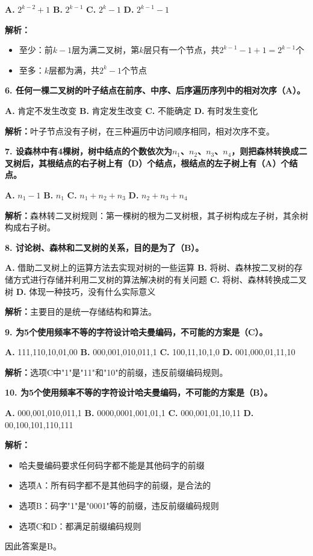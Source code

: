 \documentclass[12pt,a4paper]{amsart}
\begin{document}
\textbf{A.} $2^{k-2}+1$
\textbf{B.} $2^{k-1}$
\textbf{C.} $2^k-1$
\textbf{D.} $2^{k-1}-1$

\textbf{解析：}
\begin{itemize}
\item 至少：前$k-1$层为满二叉树，第$k$层只有一个节点，共$2^{k-1}-1+1=2^{k-1}$个
\item 至多：$k$层都为满，共$2^k-1$个节点
\end{itemize}

\textbf{6. 任何一棵二叉树的叶子结点在前序、中序、后序遍历序列中的相对次序（A）。}

\textbf{A.} 肯定不发生改变
\textbf{B.} 肯定发生改变
\textbf{C.} 不能确定
\textbf{D.} 有时发生变化

\textbf{解析：}叶子节点没有子树，在三种遍历中访问顺序相同，相对次序不变。

\textbf{7. 设森林中有4棵树，树中结点的个数依次为$n_1$、$n_2$、$n_3$、$n_4$，则把森林转换成二叉树后，其根结点的右子树上有（D）个结点，根结点的左子树上有（A）个结点。}

\textbf{A.} $n_1-1$
\textbf{B.} $n_1$
\textbf{C.} $n_1+n_2+n_3$
\textbf{D.} $n_2+n_3+n_4$

\textbf{解析：}森林转二叉树规则：第一棵树的根为二叉树根，其子树构成左子树，其余树构成右子树。

\textbf{8. 讨论树、森林和二叉树的关系，目的是为了（B）。}

\textbf{A.} 借助二叉树上的运算方法去实现对树的一些运算
\textbf{B.} 将树、森林按二叉树的存储方式进行存储并利用二叉树的算法解决树的有关问题
\textbf{C.} 将树、森林转换成二叉树
\textbf{D.} 体现一种技巧，没有什么实际意义

\textbf{解析：}主要目的是统一存储结构和算法。

\textbf{9. 为5个使用频率不等的字符设计哈夫曼编码，不可能的方案是（C）。}

\textbf{A.} 111,110,10,01,00
\textbf{B.} 000,001,010,011,1
\textbf{C.} 100,11,10,1,0
\textbf{D.} 001,000,01,11,10

\textbf{解析：}选项C中"1"是"11"和"10"的前缀，违反前缀编码规则。

\textbf{10. 为5个使用频率不等的字符设计哈夫曼编码，不可能的方案是（B）。}

\textbf{A.} 000,001,010,011,1
\textbf{B.} 0000,0001,001,01,1
\textbf{C.} 000,001,01,10,11
\textbf{D.} 00,100,101,110,111

\textbf{解析：}
\begin{itemize}
\item 哈夫曼编码要求任何码字都不能是其他码字的前缀
\item 选项A：所有码字都不是其他码字的前缀，是合法的
\item 选项B：码字"1"是"0001"等的前缀，违反前缀编码规则
\item 选项C和D：都满足前缀编码规则
\end{itemize}
因此答案是B。
\end{document}
